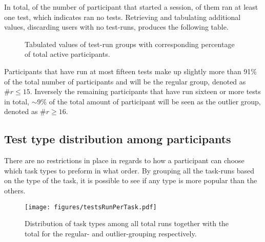     In total, of the  number of participant that
    started a session,  of them ran at least one
    test, which indicates  ran no tests. Retrieving and
    tabulating additional values, discarding users with no test-runs,
    produces the following table.

    \begin{figure}[h!]
      \centering
      \caption{%
        Tabulated values of test-run groups with corresponding percentage
        of total active participants.%
      }
    \end{figure}

    Participants that have run at most fifteen tests make up slightly more
    than 91\% of the total number of participants and will be the regular
    group, denoted as $\#r\leq15$. Inversely the remaining participants
    that have run sixteen or more tests in total, $\sim$9\% of the total
    amount of participant will be seen as the outlier group, denoted as
    $\#r\geq16$.

  \subsection{Test type distribution among participants}





    There are no restrictions in place in regards to how a participant
    can choose which task types to preform in what order. By grouping all
    the task-runs based on the type of the task, it is possible to see if
    any type is more popular than the others.

    \begin{figure}[h!]
      \centering
      \texttt{[image: figures/testsRunPerTask.pdf]}
      \caption{
        Distribution of task types among all total runs together with the
        total for the regular- and outlier-grouping respectively.
      }
    \end{figure}


